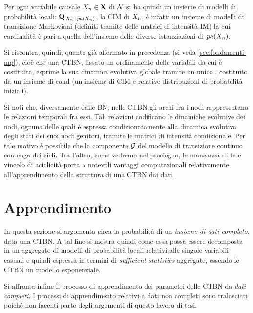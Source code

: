 Per ogni variabile causale $\mathnormal{X_n} \in \mathbf{X}$ di $\mathcal{N}$ si ha quindi un insieme di modelli di probabilità locali: $\mathbf{Q}_{\,\mathnormal{X_n}\,\arrowvert\,pa(\mathnormal{X_n})}$, la \acs{CIM} di $\mathnormal{X_n}$, è infatti un insieme di modelli di transizione Markoviani (definiti tramite delle matrici di intensità \acs{IM}) la cui cardinalità è pari a quella dell'insieme delle diverse istanziazioni di $pa(\mathnormal{X_n})$.

Si riscontra, quindi, quanto già affermato in precedenza (si veda \ref{sec:fondamenti-mp}), cioè che una \acs{CTBN}, fissato un ordinamento delle variabili da cui è costituita, esprime la sua dinamica evolutiva globale tramite un unico \mprocess{} \omog, costituito da un insieme di \mprocess{}cond{} (un insieme di \acs{CIM} e relative distribuzioni di probabilità iniziali).

Si noti che, diversamente dalle \acl{BN}, nelle \acl{CTBN} gli archi fra i nodi rappresentano le relazioni temporali fra essi. Tali relazioni codificano le dinamiche evolutive dei nodi, ognuna delle quali è espressa condizionatamente alla dinamica evolutiva degli stati dei suoi nodi genitori, tramite le matrici di intensità condizionale. Per tale motivo è possibile che la componente $\mathcal{G}$ del modello di transizione continuo contenga dei cicli. Tra l'altro, come vedremo nel prosieguo, la mancanza di tale vincolo di aciclicità porta a notevoli vantaggi computazionali relativamente all'apprendimento della struttura di una \acs{CTBN} dai dati.

\section{Apprendimento}
\label{sec:ctbn-apprendimento}
In questa sezione si argomenta circa la probabilità di un \emph{insieme di dati completo}, data una \acl{CTBN}. A tal fine si mostra quindi come essa possa essere decomposta in un aggregato di modelli di probabilità locali relativi alle singole variabili casuali e quindi espressa in termini di \emph{sufficient statistics} aggregate, essendo le \acs{CTBN} un modello esponenziale.

Si affronta infine il processo di apprendimento dei parametri delle \acl{CTBN} da \emph{dati completi}. I processi di apprendimento relativi a dati non completi sono tralasciati poiché non facenti parte degli argomenti di questo lavoro di tesi.

